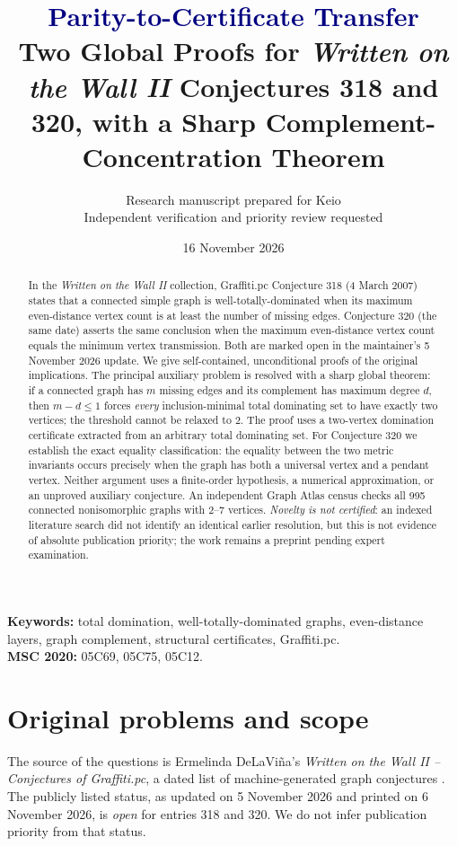 \documentclass[11pt,a4paper]{article}
\title{\textcolor{navy}{Parity-to-Certificate Transfer}\\[5pt]
\large Two Global Proofs for \emph{Written on the Wall II} Conjectures 318 and 320, with a Sharp Complement-Concentration Theorem}
\author{Research manuscript prepared for Keio\\[4pt]\small Independent verification and priority review requested}
\date{16 November 2026}
\theoremstyle{definition}\newtheorem{definition}[theorem]{Definition}
\theoremstyle{remark}\newtheorem{remark}[theorem]{Remark}
\begin{document}
\maketitle
\begin{abstract}
In the \emph{Written on the Wall II} collection, Graffiti.pc Conjecture 318 (4 March 2007) states that a connected simple graph is well-totally-dominated when its maximum even-distance vertex count is at least the number of missing edges. Conjecture 320 (the same date) asserts the same conclusion when the maximum even-distance vertex count equals the minimum vertex transmission. Both are marked open in the maintainer's 5 November 2026 update. We give self-contained, unconditional proofs of the original implications. The principal auxiliary problem is resolved with a sharp global theorem: if a connected graph has $m$ missing edges and its complement has maximum degree $d$, then $m-d\le 1$ forces \emph{every} inclusion-minimal total dominating set to have exactly two vertices; the threshold cannot be relaxed to $2$. The proof uses a two-vertex domination certificate extracted from an arbitrary total dominating set. For Conjecture 320 we establish the exact equality classification: the equality between the two metric invariants occurs precisely when the graph has both a universal vertex and a pendant vertex. Neither argument uses a finite-order hypothesis, a numerical approximation, or an unproved auxiliary conjecture. An independent Graph Atlas census checks all 995 connected nonisomorphic graphs with 2--7 vertices. \emph{Novelty is not certified}: an indexed literature search did not identify an identical earlier resolution, but this is not evidence of absolute publication priority; the work remains a preprint pending expert examination.
\end{abstract}
\noindent\textbf{Keywords:} total domination, well-totally-dominated graphs, even-distance layers, graph complement, structural certificates, Graffiti.pc.\\
\textbf{MSC 2020:} 05C69, 05C75, 05C12.
\tableofcontents

\section{Original problems and scope}
The source of the questions is Ermelinda DeLaVi\~na's \emph{Written on the Wall II -- Conjectures of Graffiti.pc}, a dated list of machine-generated graph conjectures \cite{DeLaVina2026}. The publicly listed status, as updated on 5 November 2026 and printed on 6 November 2026, is \emph{open} for entries 318 and 320. We do not infer publication priority from that status.
\end{document}
